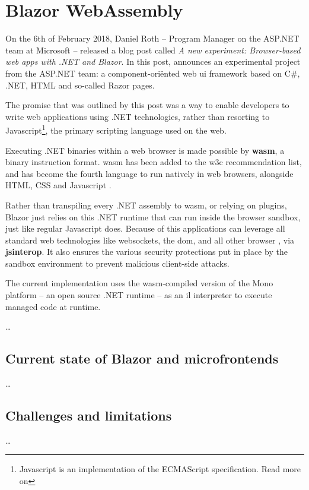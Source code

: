 \section{Blazor WebAssembly}

On the 6th of February 2018, Daniel Roth -- Program Manager on the ASP.NET team
at Microsoft -- released a blog post called \textit{A new experiment:
Browser-based web apps with .NET and Blazor}. In this post, \textcite{Roth_2018}
announces an experimental project from the ASP.NET team: a component-ori\"ented
web \gls{ui} framework based on C\#, .NET, HTML and so-called Razor pages. 

The promise that was outlined by this post was a way to enable developers to
write web applications using .NET technologies, rather than resorting to
Javascript\footnote{Javascript is an implementation of the ECMAScript
specification. Read more on }, the
primary scripting language used on the web.

Executing .NET binaries within a web browser is made possible by
\textbf{\gls{wasm}}, a binary instruction format.
\Gls{wasm} has been added to the \gls{w3c} recommendation list, and has become
the fourth language to run natively in web browsers, alongside HTML, CSS and
Javascript \autocite{Couriol_2019}. 

Rather than \gls{transpiling} every .NET assembly to \gls{wasm}, or relying on
plugins, Blazor just relies on this .NET runtime that can run inside the browser
sandbox, just like regular Javascript does. Because of this applications can
leverage all standard web technologies like websockets, the \gls{dom}, and all
other browser , via \textbf{\gls{jsinterop}}. It also ensures the
various security protections put in place by the sandbox environment to prevent
malicious client-side attacks.

The current implementation uses the \gls{wasm}-compiled version of the
Mono platform -- an open source .NET
runtime -- as an \gls{il} interpreter to execute managed code at runtime.


\dots %


\subsection{Current state of Blazor and microfrontends}
\dots %

\subsection{Challenges and limitations}
\dots %